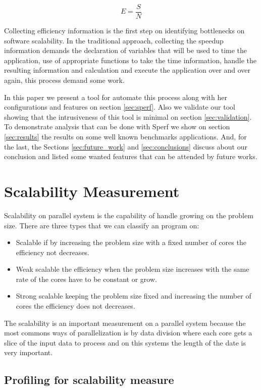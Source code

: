 \documentclass[sigconf]{acmart}
\begin{document}
\begin{equation}
  E = \frac{S}{N}
  \label{eq:efficiency}
\end{equation}

Collecting efficiency information is the first step on identifying bottlenecks on software scalability. In the traditional approach, collecting the speedup information demands the declaration of variables that will be used to time the application, use of appropriate functions to take the time information, handle the resulting information and calculation and execute the application over and over again, this process demand some work.

In this paper we present a tool for automate this process along with her configurations and features on section \ref{sec:sperf}. Also we validate our tool showing that the intrusiveness of this tool is minimal on section \ref{sec:validation}. To demonstrate analysis that can be done with Sperf we show on section \ref{sec:results} the results on some well known benchmarks applications. And, for the last, the Sections \ref{sec:future_work} and \ref{sec:conclusions} discuss about our conclusion and listed some wanted features that can be attended by future works.


\section{Scalability Measurement}
\label{sec:scalability_measurement}
Scalability on parallel system is the capability of handle growing on the problem size. There are three types that we can classify an program on:
\begin{itemize}
\item Scalable if by increasing the problem size with a fixed number of cores the efficiency not decreases.
\item Weak scalable the efficiency when the problem size increases with the same rate of the cores have to be constant or grow.
\item Strong scalable keeping the problem size fixed and increasing the number of cores the efficiency does not decreases. 
\end{itemize}
The scalability is an important measurement on a parallel system because the most commons ways of parallelization is by data division where each core gets a slice of the input data to process and on this systems the length of the date is very important.

\subsection{Profiling for scalability measure}
\label{subsec:profiling}
\end{document}
